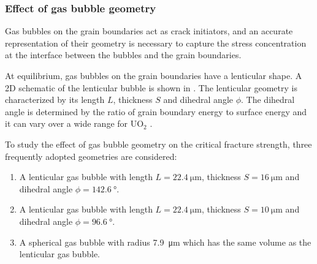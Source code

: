 \subsubsection{Effect of gas bubble geometry}

Gas bubbles on the grain boundaries act as crack initiators, and an accurate representation of their geometry is necessary to capture the stress concentration at the interface between the bubbles and the grain boundaries.

At equilibrium, gas bubbles on the grain boundaries have a lenticular shape. A 2D schematic of the lenticular bubble is shown in . The lenticular geometry is characterized by its length $L$, thickness $S$ and dihedral angle $\phi$. The dihedral angle is determined by the ratio of grain boundary energy to surface energy and it can vary over a wide range for UO$_2$ \cite{HODKIN19807,REYNOLDS1971112}.

To study the effect of gas bubble geometry on the critical fracture strength, three frequently adopted geometries are considered:
\begin{enumerate}[label=(\roman*)]
  \item A lenticular gas bubble with length $L = \SI{22.4}{\micro\meter}$, thickness $S = \SI{16}{\micro\meter}$ and dihedral angle $\phi = \SI{142.6}{\degree}$.
  \item A lenticular gas bubble with length $L = \SI{22.4}{\micro\meter}$, thickness $S = \SI{10}{\micro\meter}$ and dihedral angle $\phi = \SI{96.6}{\degree}$.
  \item A spherical gas bubble with radius \SI{7.9}{\micro\meter} which has the same volume as the lenticular gas bubble.
\end{enumerate}

